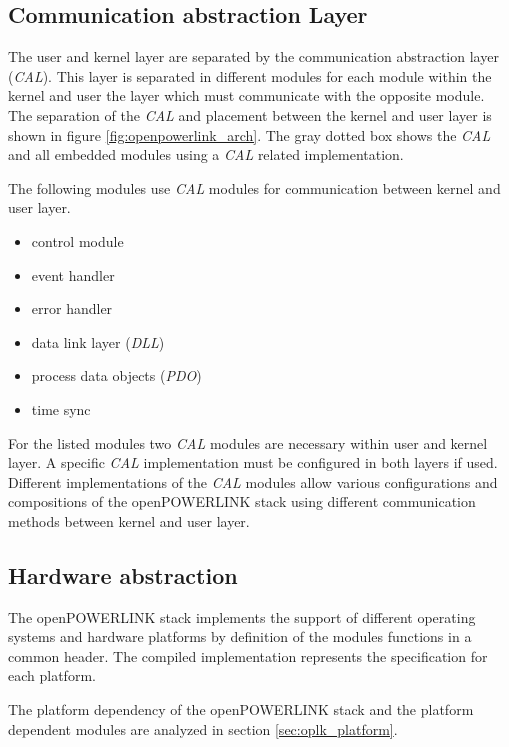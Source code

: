 \subsection{Communication abstraction Layer}
\label{sec:oplk_architecture_cal}

The user and kernel layer are separated by the communication abstraction layer (\emph{CAL}).
This layer is separated in different modules for each module within the kernel and user the layer which must communicate with the opposite module.
The separation of the \emph{CAL} and placement between the kernel and user layer is shown in figure \ref{fig:openpowerlink_arch}.
The gray dotted box shows the \emph{CAL} and all embedded modules using a \emph{CAL} related implementation.

The following modules use \emph{CAL} modules for communication between kernel and user layer. 

\begin{itemize}
    \item control module
    \item event handler
    \item error handler
    \item data link layer (\emph{DLL})
    \item process data objects (\emph{PDO})
    \item time sync
\end{itemize}

For the listed modules two \emph{CAL} modules are necessary within user and kernel layer.
A specific \emph{CAL} implementation must be configured in both layers if used.
Different implementations of the \emph{CAL} modules allow various configurations and compositions of the openPOWERLINK stack using different communication methods between kernel and user layer. \cite[CAL]{openpowerlink_doc}

\subsection{Hardware abstraction}
\label{sec:oplk_architecture_hardware}
The openPOWERLINK stack implements the support of different operating systems and hardware platforms by definition of the modules functions in a common header.
The compiled implementation represents the specification for each platform.

The platform dependency of the openPOWERLINK stack and the platform dependent modules are analyzed in section \ref{sec:oplk_platform}.

